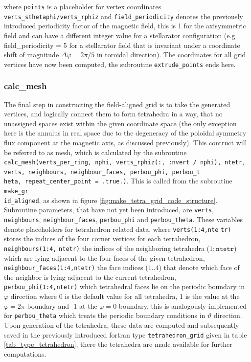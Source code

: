 \documentclass[./main.tex]{subfiles}
\begin{document}
where \texttt{points} is a placeholder for vertex coordinates \texttt{verts\_sthetaphi/verts\_rphiz} and \texttt{field\_periodicity} denotes the previously introduced periodicity factor of the magnetic field, this is 1 for the axisymmetric field and can have a different integer value for a stellarator configuration (e.g. field\_periodicity = 5 for a stellarator field that is invariant under a coordinate shift of magnitude $\Delta\varphi=2\pi/5$ in toroidal direction). The coordinates for all grid vertices have now been computed, the subroutine \texttt{extrude\_points} ends here.
\subsubsection{calc\_mesh}

The final step in constructing the field-aligned grid is to take the generated vertices, and logically connect them to form tetrahedra in a way, that no unassigned spaces exist within the given coordinate space (the only exception here is the annulus in real space due to the degeneracy of the poloidal symmetry flux component at the magnetic axis, as discussed previously). 
This contruct will be referred to as mesh, which is calculated by the subroutine \texttt{calc\_mesh(verts\_per\_ring, nphi, verts\_rphiz(:, :nvert / nphi), ntetr, verts, neighbours, neighbour\_faces, perbou\_phi, perbou\_t}\\
\texttt{heta, repeat\_center\_point = .true.)}. This is called from the subroutine \texttt{make\_gr}\\
\texttt{id\_aligned}, as shown in figure \ref{fig:make_tetra_grid_code_structure}. Subroutine parameters, that have not yet been introduced, are \texttt{verts}, \texttt{neighbours}, \texttt{neighbour\_faces}, \texttt{perbou\_phi} and \texttt{perbou\_theta}. These variables denote placeholders for tetrahedron related data, where \texttt{verts(1:4,nte}
\texttt{tr)} stores the indices of the four corner vertices for each tetrahedron, \texttt{neighbours(1:4,}
\texttt{ntetr)} the indices of the neighboring tetrahedra ($1:\texttt{ntetr}$) which are lying adjacent to the four faces of the given tetrahedron, \texttt{neighbour\_faces(1:4,ntetr)} the face indices ($1..4$) that denote which face of the neighbor is lying adjacent to the current tetrahedron, \texttt{perbou\_phi(1:4,ntetr)} which tetrahedral faces lie on the periodic boundary in $\varphi$ direction where 0 is the default value for all tetrahedra, 1 is the value at the $\varphi = 2\pi$ boundary and -1 at the $\varphi = 0$ boundary, this is analogously implemented for \texttt{perbou\_theta} which treats the periodic boundary conditions in $\vartheta$ direction. Upon generation of the tetrahedra, these data are computed and subsequently saved in the previously introduced fortran type  \texttt{tetrahedron\_grid} given in table \ref{tab_type_tetrahedron}, there the tetrahedra are made available for further computations.
\end{document}

